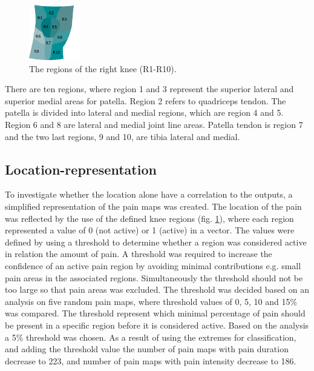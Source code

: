 \begin{figure} [H] 
\centering
\includegraphics[width=0.2\textwidth]{Figures/atlas}
\caption{The regions of the right knee (R1-R10).}
\label{fig:atlas}
\end{figure}

\noindent 
There are ten regions, where region 1 and 3 represent the superior lateral and superior medial areas for patella. Region 2 refers to quadriceps tendon. The patella is divided into lateral and medial regions, which are region 4 and 5. Region 6 and 8 are lateral and medial joint line areas. Patella tendon is region 7 and the two last regions, 9 and 10, are tibia lateral and medial.\citep{Elson2010}

\subsection*{\textbf{Location-representation}} 
To investigate whether the location alone have a correlation to the outputs, a simplified representation of the pain maps was created. The location of the pain was reflected by the use of the defined knee regions (fig. \ref{fig:atlas}), where each region represented a value of 0 (not active) or 1 (active) in a vector.  The values were defined by using a threshold to determine whether a region was considered active in relation the amount of pain. A threshold was required to increase the confidence of an active pain region by avoiding minimal contributions e.g. small pain areas in the associated regions. Simultaneously the threshold should not be too large so that pain areas was excluded. The threshold was decided based on an analysis on five random pain maps, where threshold values of 0, 5, 10 and 15\% was compared. The threshold represent which minimal percentage of pain should be present in a specific region before it is considered active. Based on the analysis a 5\% threshold was chosen. As a result of using the extremes for classification, and adding the threshold value the number of pain maps with pain duration decrease to 223, and number of pain maps with pain intensity decrease to 186.  

